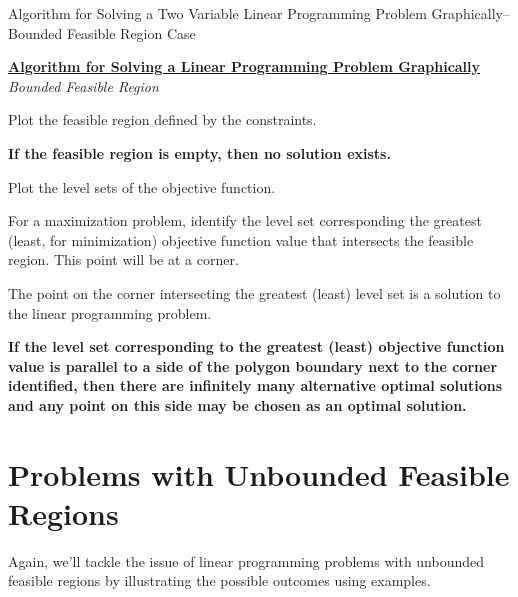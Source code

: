 \begin{algorithm}[H]
\caption{Algorithm for Solving a Two Variable Linear Programming Problem Graphically--Bounded Feasible Region Case}
\label{alg:GraphLPBoundedEmpty}
\begin{center}
\begin{minipage}[t]{\textwidth-1em}
\underline{\textbf{Algorithm for Solving a Linear Programming Problem Graphically}}\\
\textit{Bounded Feasible Region}
\begin{enumerate*}
\item Plot the feasible region defined by the constraints.
\item \textbf{If the feasible region is empty, then no solution exists.}
\item Plot the level sets of the objective function.
\item For a maximization problem, identify the level set corresponding the greatest (least, for minimization) objective function value that intersects the feasible region. This point will be at a corner. 
\item The point on the corner intersecting the greatest (least) level set is a solution to the linear programming problem. 
\item \textbf{If the level set corresponding to the greatest (least) objective function value is parallel to a side of the polygon boundary next to the corner identified, then there are infinitely many alternative optimal solutions and any point on this side may be chosen as an optimal solution.} 
\end{enumerate*}
\end{minipage}
\end{center}
\end{algorithm}

\section{Problems with Unbounded Feasible Regions}
Again, we'll tackle the issue of linear programming problems with unbounded feasible regions by illustrating the possible outcomes using examples.

